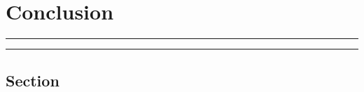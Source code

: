 \chapter{Conclusion}\label{chap:Conc}%
\vfill
\hrule \vspace{.5cm}
{\hypersetup{linkcolor = black}
\localtableofcontents
}%
\vspace{.5cm} \hrule
\vfill
\clearpage

\section{Section}